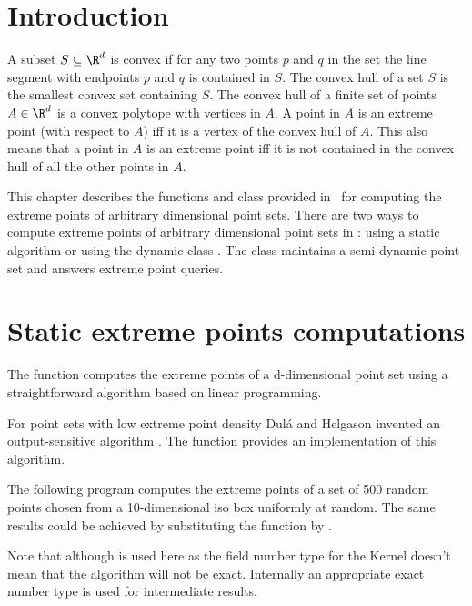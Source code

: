 

\section{Introduction}

A subset $S \subseteq \R^d$ is convex if for any two points $p$ and $q$ in the set the line segment with endpoints $p$ and $q$ is contained in $S$. The convex hull of a set $S$ is the smallest convex set containing $S$. The convex hull of a finite set of points $A \in \R^d$ is a convex polytope with vertices in $A$. A point in $A$ is an extreme point  (with respect to $A$) iff it is a vertex of the convex hull of $A$. This also means that a point in $A$ is an extreme point iff it is not contained in the convex hull of all the other points in $A$.

This chapter describes the functions and class provided in \cgal\ for computing the extreme points of arbitrary dimensional point sets. There are two ways to compute extreme points of arbitrary dimensional point sets in \cgal: using a static algorithm or using the dynamic class . The class  maintains a semi-dynamic point set and answers extreme point queries.

\section{Static extreme points computations}
The function  computes the extreme points of a d-dimensional point set using a straightforward algorithm based on linear programming.

For point sets with low extreme point density Dul\'a and Helgason invented an output-sensitive algorithm \cite{cgal:dh-pifch-96}. The function  provides an implementation of this algorithm.

\ccExample
The following program computes the extreme points of a set of 500 random points chosen from a 10-dimensional iso box uniformly at random. The same results could be achieved by substituting the function  by . 

Note that although  is used here as the field number type for the Kernel doesn't mean that the algorithm will not be exact. Internally an appropriate exact number type is used for intermediate results. 

